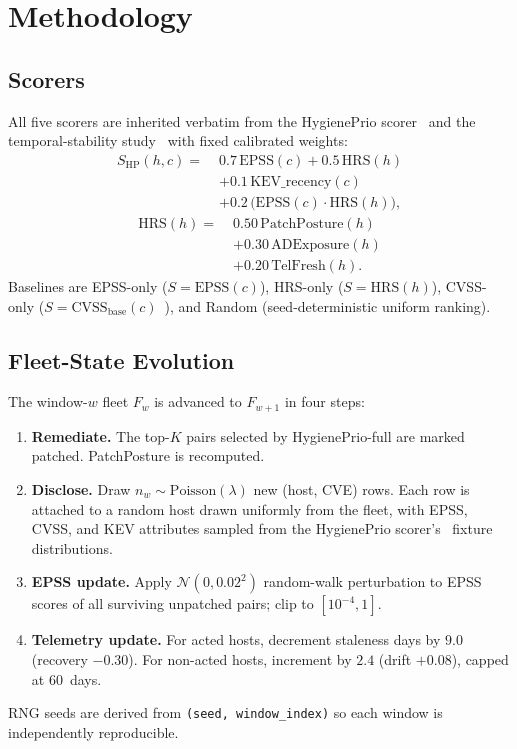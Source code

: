 \section{Methodology}

\subsection{Scorers}

All five scorers are inherited verbatim from the HygienePrio scorer~\cite{paper4hygieneprio}
and the temporal-stability study~\cite{paper5temporal} with fixed calibrated weights:
\begin{equation}
\begin{aligned}
S_{\mathrm{HP}}(h,c) =\;& 0.7\,\mathrm{EPSS}(c) + 0.5\,\mathrm{HRS}(h) \\
 & + 0.1\,\mathrm{KEV\_recency}(c) \\
 & + 0.2\,\bigl(\mathrm{EPSS}(c) \cdot \mathrm{HRS}(h)\bigr),
\end{aligned}
\label{eq:hp}
\end{equation}
\begin{equation}
\begin{aligned}
\mathrm{HRS}(h) =\;& 0.50\,\mathrm{PatchPosture}(h) \\
 & + 0.30\,\mathrm{ADExposure}(h) \\
 & + 0.20\,\mathrm{TelFresh}(h).
\end{aligned}
\end{equation}
Baselines are EPSS-only ($S = \mathrm{EPSS}(c)$), HRS-only
($S = \mathrm{HRS}(h)$), CVSS-only ($S = \mathrm{CVSS}_{\mathrm{base}}(c)$~\cite{first2019cvss}),
and Random (seed-deterministic uniform ranking).

\subsection{Fleet-State Evolution}

The window-$w$ fleet $F_w$ is advanced to $F_{w+1}$ in four steps:
\begin{enumerate}
\item \textbf{Remediate.} The top-$K$ pairs selected by HygienePrio-full
are marked patched. PatchPosture is recomputed.
\item \textbf{Disclose.} Draw $n_w \sim \mathrm{Poisson}(\lambda)$ new
(host, CVE) rows. Each row is attached to a random host drawn uniformly
from the fleet, with EPSS, CVSS, and KEV attributes sampled from the
HygienePrio scorer's~\cite{paper4hygieneprio} fixture distributions.
\item \textbf{EPSS update.} Apply $\mathcal{N}(0, 0.02^2)$ random-walk
perturbation to EPSS scores of all surviving unpatched pairs; clip to
$[10^{-4}, 1]$.
\item \textbf{Telemetry update.} For acted hosts, decrement staleness
days by $9.0$ (recovery $-0.30$). For non-acted hosts, increment by
$2.4$ (drift $+0.08$), capped at 60~days.
\end{enumerate}
RNG seeds are derived from \texttt{(seed, window\_index)} so each
window is independently reproducible.


